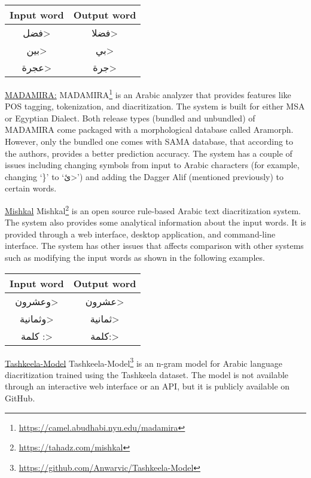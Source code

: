 \documentclass[conference]{IEEEtran}
\newcommand{\softpara}[1]{\smallskip \noindent \underline{#1}}
\begin{document}
\begin{center}
\begin{tabular}{|c|c|}
\hline
Input word & Output word \\ \hline
\<فضل> & 
\<فضلا> \\ \hline
\<بين> & 
\<بي> \\ \hline
\<عجرة> & 
\<جرة> \\ \hline
\end{tabular}
\end{center}

\softpara{MADAMIRA:}
MADAMIRA\footnote{\url{https://camel.abudhabi.nyu.edu/madamira}} is an Arabic analyzer that provides features like POS tagging, tokenization, and diacritization. The system is built for either MSA or Egyptian Dialect. Both release types (bundled and unbundled) of MADAMIRA come packaged with a morphological database called Aramorph. However, only the bundled one comes with SAMA database, that according to the authors, provides a better prediction accuracy. The system has a couple of issues including changing symbols from input to Arabic characters
(for example, changing
`\}'
to `\<ئ>')
and adding the Dagger Alif (mentioned previously) to certain words.

\softpara{Mishkal}
Mishkal\footnote{\url{https://tahadz.com/mishkal}} is an open source rule-based Arabic text diacritization system. The system also provides some analytical information about the input words. It is provided through a web interface, desktop application, and command-line interface. The system has other issues that affects comparison with other systems such as modifying the input words as shown in the following examples.

\begin{center}
\begin{tabular}{|c|c|}
\hline
Input word & Output word \\ \hline
\<وعشرون> & 
\<عشرون> \\ \hline
\<وثمانية> & 
\<ثمانية> \\ \hline
\<كلمة :> & 
\<كلمة:> \\ \hline
\end{tabular}
\end{center}


\softpara{Tashkeela-Model}
Tashkeela-Model\footnote{\url{ https://github.com/Anwarvic/Tashkeela-Model}} is an n-gram model for Arabic language diacritization trained using the Tashkeela dataset. The model is not available through an interactive web interface or an API, but it is publicly available on GitHub.
\end{document}
